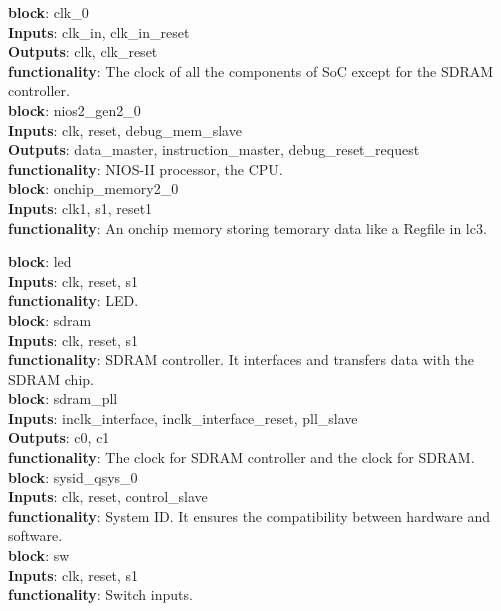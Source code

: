 \documentclass[12pt]{article}
\begin{document}
\textbf{block}: clk\_0 \\
\textbf{Inputs}: clk\_in, clk\_in\_reset \\
\textbf{Outputs}: clk, clk\_reset \\
\textbf{functionality}: The clock of all the components of SoC except for the SDRAM controller. \\

\textbf{block}: nios2\_gen2\_0 \\
\textbf{Inputs}: clk, reset, debug\_mem\_slave \\
\textbf{Outputs}: data\_master, instruction\_master, debug\_reset\_request \\
\textbf{functionality}: NIOS-II processor, the CPU. \\

\textbf{block}: onchip\_memory2\_0 \\
\textbf{Inputs}: clk1, s1, reset1 \\
\textbf{functionality}: An onchip memory storing temorary data like a Regfile in lc3.

\textbf{block}: led \\
\textbf{Inputs}: clk, reset, s1 \\
\textbf{functionality}: LED. \\

\textbf{block}: sdram \\
\textbf{Inputs}: clk, reset, s1 \\
\textbf{functionality}: SDRAM controller. It interfaces and transfers data with the SDRAM chip. \\

\textbf{block}: sdram\_pll \\
\textbf{Inputs}: inclk\_interface, inclk\_interface\_reset, pll\_slave \\
\textbf{Outputs}: c0, c1 \\
\textbf{functionality}: The clock for SDRAM controller and the clock for SDRAM. \\

\textbf{block}: sysid\_qsys\_0 \\
\textbf{Inputs}: clk, reset, control\_slave \\
\textbf{functionality}: System ID. It ensures the compatibility between hardware and software. \\

\textbf{block}: sw \\
\textbf{Inputs}: clk, reset, s1 \\
\textbf{functionality}: Switch inputs. \\
\end{document}
